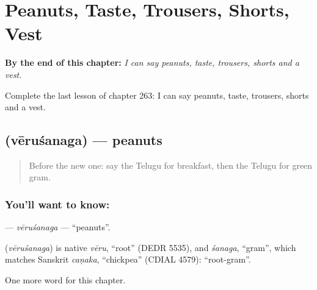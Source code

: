 
\chapter{Peanuts, Taste, Trousers, Shorts, Vest}
\label{ch:te-peanuts-taste-trousers-shorts-vest}

\begin{chapteropening}
\textbf{By the end of this chapter:} \emph{I can say peanuts, taste, trousers, shorts and a vest.}

Complete the last lesson of chapter 263: I can say peanuts, taste, trousers, shorts and a vest.
\end{chapteropening}

\section[\texorpdfstring{\te{వేరుశనగ} (vēruśanaga)}{వేరుశనగ (vēruśanaga)}]{ (vēruśanaga) — peanuts}

\label{lesson:TE-C263-verusanaga}



\begin{quote}
Before the new one: say the Telugu for breakfast, then the Telugu for green gram.
\end{quote}

\subsection*{You'll want to know: }
\textbf{} — \emph{vēruśanaga} — \textquotedblleft{}peanuts\textquotedblright{}.

\begin{cousinweb}
\textbf{} (\emph{vēruśanaga}) is native \emph{vēru}, \textquotedblleft{}root\textquotedblright{} (DEDR 5535), and \emph{śanaga}, \textquotedblleft{}gram\textquotedblright{}, which matches Sanskrit \emph{caṇaka}, \textquotedblleft{}chickpea\textquotedblright{} (CDIAL 4579): \textquotedblleft{}root-gram\textquotedblright{}.
\end{cousinweb}

\begin{grammarlens}[title={What you've built}]
One more word for this chapter.
\end{grammarlens}

